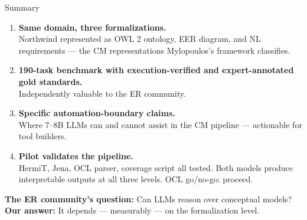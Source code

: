 \documentclass[aspectratio=169]{beamer}
\begin{document}
\begin{frame}{Summary}

\begin{enumerate}
    \item \textbf{Same domain, three formalizations.}\\
    Northwind represented as OWL 2 ontology, EER diagram, and NL requirements --- the CM representations Mylopoulos's framework classifies.

    \vspace{0.3em}
    \item \textbf{190-task benchmark with execution-verified and expert-annotated gold standards.}\\
    Independently valuable to the ER community.

    \vspace{0.3em}
    \item \textbf{Specific automation-boundary claims.}\\
    Where 7--8B LLMs can and cannot assist in the CM pipeline --- actionable for tool builders.

    \vspace{0.3em}
    \item \textbf{Pilot validates the pipeline.}\\
    HermiT, Jena, OCL parser, coverage script all tested. Both models produce interpretable outputs at all three levels. OCL go/no-go: proceed.
\end{enumerate}

\vspace{1em}
\centering
\textbf{The ER community's question:} Can LLMs reason over conceptual models?\\
\textbf{Our answer:} It depends --- measurably --- on the formalization level.

\end{frame}
\end{document}
